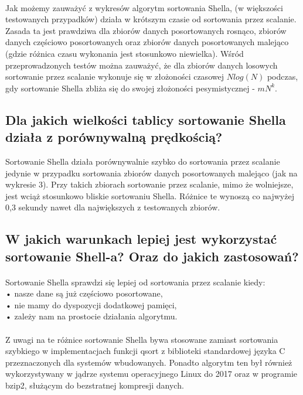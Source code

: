 \documentclass{article}
\begin{document}
\paragraph{}Jak możemy zauważyć z wykresów algorytm sortowania Shella, (w większości testowanych przypadków) działa w krótszym czasie od sortowania przez scalanie. Zasada ta jest prawdziwa dla zbiorów danych posortowanych rosnąco, zbiorów danych częściowo posortowanych oraz zbiorów danych posortowanych malejąco (gdzie różnica czasu wykonania jest stosunkowo niewielka). Wśród przeprowadzonych testów można zauważyć, że dla zbiorów danych losowych sortowanie przez scalanie wykonuje się w złożoności czasowej ${Nlog(N)}$ podczas, gdy sortowanie Shella zbliża się do swojej złożoności pesymistycznej - ${mN^k}$.

\break
\subsection{Dla jakich wielkości tablicy sortowanie Shella działa z porównywalną prędkością?}
Sortowanie Shella działa porównywalnie szybko do sortowania przez scalanie jedynie w przypadku sortowania zbiorów danych posortowanych malejąco (jak na wykresie 3). Przy takich zbiorach sortowanie przez scalanie, mimo że wolniejsze, jest wciąż stosunkowo bliskie sortowaniu Shella. Różnice te wynoszą co najwyżej 0,3 sekundy nawet dla największych z testowanych zbiorów.

\subsection{W jakich warunkach lepiej jest wykorzystać sortowanie Shell-a? Oraz do jakich zastosowań?}
\paragraph{} Sortowanie Shella sprawdzi się lepiej od sortowania przez scalanie kiedy:\\
• nasze dane są już częściowo posortowane,\\
• nie mamy do dyspozycji dodatkowej pamięci,\\
• zależy nam na prostocie działania algorytmu.
\paragraph{} 

Z uwagi na te różnice sortowanie Shella bywa stosowane zamiast sortowania szybkiego w implementacjach funkcji qsort z biblioteki standardowej języka C przeznaczonych dla systemów wbudowanych. Ponadto algorytm ten był również wykorzystywany w jądrze systemu operacyjnego Linux do 2017 oraz w programie bzip2, służącym do bezstratnej kompresji danych.
\end{document}

